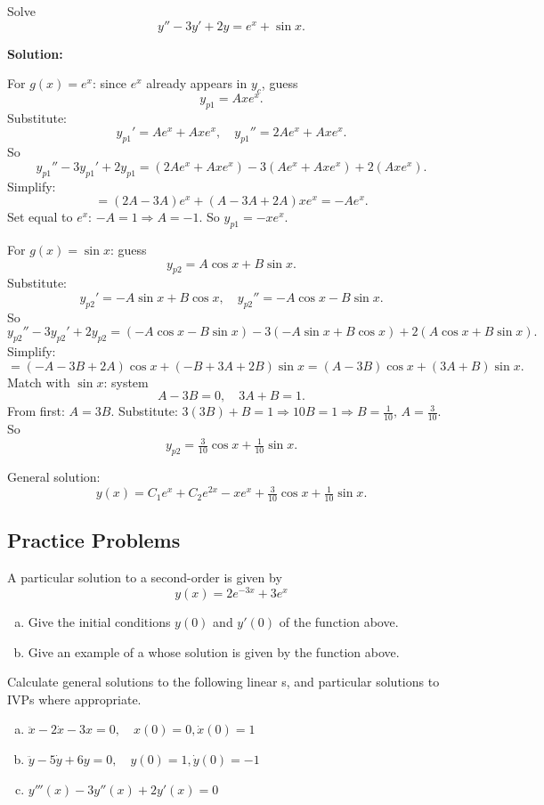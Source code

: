   \begin{example}
  Solve
  \[
  y'' - 3y' + 2y = e^x + \sin x.
  \]

  \textbf{Solution:}  

  For $g(x)=e^x$: since $e^x$ already appears in $y_c$, guess
  \[
  y_{p1}=Ax e^x.
  \]
  Substitute:
  \[
  y_{p1}'=Ae^x+Ax e^x, \quad y_{p1}''=2Ae^x+Ax e^x.
  \]
  So
  \[
  y_{p1}'' - 3y_{p1}' + 2y_{p1} = (2Ae^x+Ax e^x) -3(Ae^x+Ax e^x)+2(Ax e^x).
  \]
  Simplify:
  \[
  = (2A-3A)e^x + (A-3A+2A)x e^x = -Ae^x.
  \]
  Set equal to $e^x$: $-A=1 \Rightarrow A=-1$.  
  So $y_{p1}=-xe^x$.

  For $g(x)=\sin x$: guess
  \[
  y_{p2}=A\cos x + B\sin x.
  \]
  Substitute:
  \[
  y_{p2}'=-A\sin x + B\cos x, \quad y_{p2}''=-A\cos x -B\sin x.
  \]
  So
  \[
  y_{p2}'' - 3y_{p2}' + 2y_{p2} = (-A\cos x -B\sin x) -3(-A\sin x+B\cos x)+2(A\cos x+B\sin x).
  \]
  Simplify:
  \[
  =(-A-3B+2A)\cos x + (-B+3A+2B)\sin x = (A-3B)\cos x+(3A+B)\sin x.
  \]
  Match with $\sin x$: system
  \[
  A-3B=0, \quad 3A+B=1.
  \]
  From first: $A=3B$. Substitute: $3(3B)+B=1 \Rightarrow 10B=1 \Rightarrow B=\tfrac{1}{10}, \, A=\tfrac{3}{10}$.
  So
  \[
  y_{p2}=\tfrac{3}{10}\cos x+\tfrac{1}{10}\sin x.
  \]

  General solution:
  \[
  y(x)=C_1e^x+C_2e^{2x}-xe^x+\tfrac{3}{10}\cos x+\tfrac{1}{10}\sin x.
  \]
  \end{example}





  \subsection*{Practice Problems}%

  \begin{question}
    A particular solution to a second-order \ode{} is given by
    \[
      y(x) = 2e^{-3x} + 3 e^{x}
    \]

    \begin{enumerate}[(a)]
    \item Give the initial conditions \(y(0)\) and \(y'(0)\) of the function above.
    \item Give an example of a \ode{} whose solution is given by the function above.
  \end{enumerate}
  \end{question}

  \begin{question}
    Calculate general solutions to the following linear \ode{}s, and particular solutions to IVPs where appropriate.
    \begin{enumerate}[(a)]
    \item \(\ddot{x} - 2\dot{x} - 3x = 0,\quad x(0) = 0, \dot x(0) = 1\)
    \item \(\ddot{y} - 5\dot{y} + 6y = 0,\quad y(0) = 1, \dot y(0) = -1\)
    \item \(y'''(x) - 3y''(x) + 2y'(x) = 0\)
    \end{enumerate}
  \end{question}

